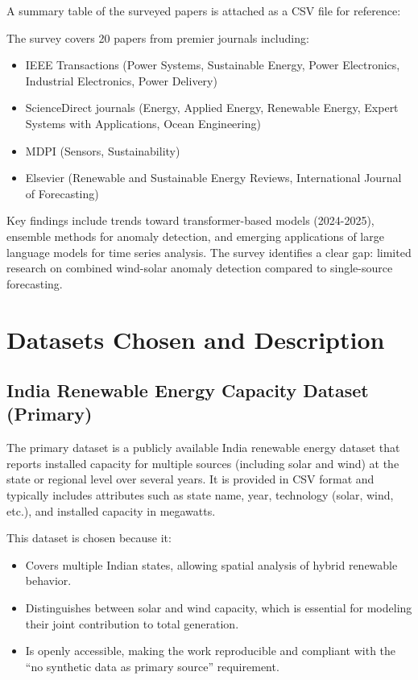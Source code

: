 \documentclass[12pt,a4paper]{article}
\begin{document}
\noindent A summary table of the surveyed papers is attached as a CSV file for reference:\newline
\vspace{0.3cm}

\noindent The survey covers 20 papers from premier journals including:
\begin{itemize}
    \item IEEE Transactions (Power Systems, Sustainable Energy, Power Electronics, Industrial Electronics, Power Delivery)
    \item ScienceDirect journals (Energy, Applied Energy, Renewable Energy, Expert Systems with Applications, Ocean Engineering)
    \item MDPI (Sensors, Sustainability)
    \item Elsevier (Renewable and Sustainable Energy Reviews, International Journal of Forecasting)
\end{itemize}

Key findings include trends toward transformer-based models (2024-2025), ensemble methods for anomaly detection, and emerging applications of large language models for time series analysis. The survey identifies a clear gap: limited research on combined wind-solar anomaly detection compared to single-source forecasting.

\section{Datasets Chosen and Description}

\subsection{India Renewable Energy Capacity Dataset (Primary)}
The primary dataset is a publicly available India renewable energy dataset that reports installed capacity for multiple sources (including solar and wind) at the state or regional level over several years.\cite{kaggle_india_renewables} It is provided in CSV format and typically includes attributes such as state name, year, technology (solar, wind, etc.), and installed capacity in megawatts.\cite{kaggle_india_renewables} 

This dataset is chosen because it:
\begin{itemize}
    \item Covers multiple Indian states, allowing spatial analysis of hybrid renewable behavior.\cite{kaggle_india_renewables}
    \item Distinguishes between solar and wind capacity, which is essential for modeling their joint contribution to total generation.\cite{kaggle_india_renewables}
    \item Is openly accessible, making the work reproducible and compliant with the ``no synthetic data as primary source'' requirement.\cite{kaggle_india_renewables}
\end{itemize}
\end{document}
